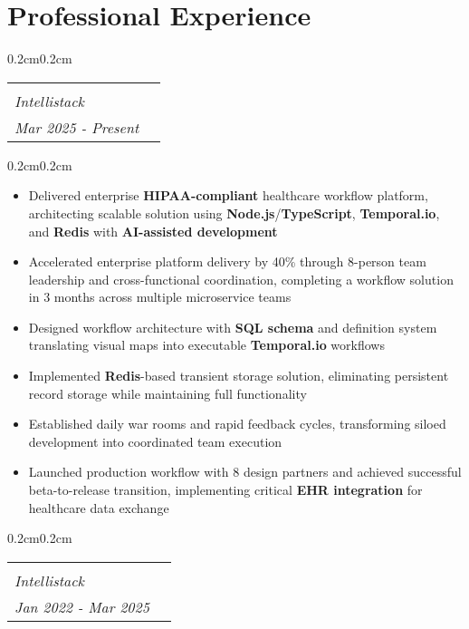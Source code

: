 \documentclass[10pt, letterpaper]{article}
\makeatletter
\newenvironment{highlights}{
    \begin{itemize}[
        topsep=0.10 cm,
        parsep=0.10 cm,
        partopsep=0pt,
        itemsep=0pt,
        leftmargin=0.4 cm + 10pt
    ]
}{
    \end{itemize}
}
\newenvironment{onecolentry}{
    \begin{adjustwidth}{0.2cm}{0.2cm}
}{
    \end{adjustwidth}
}
\newcommand{\jobentry}[4]{
    \begin{onecolentry}
        \noindent
        \begin{tabularx}{\textwidth}{@{}X>{\raggedleft\arraybackslash}p{3cm}@{\hspace{0.2cm}}}
            \begin{tabular}[t]{@{}l@{}}
                \textbf{#1}\\
                \textit{#2}
            \end{tabular} &
            \begin{tabular}[t]{@{}r@{}}
                #4\\
                \textit{#3}
            \end{tabular}
        \end{tabularx}
    \end{onecolentry}
}
\makeatother
\begin{document}
    \section{Professional Experience}
    
    \jobentry{Software Architect}{Intellistack}{Mar 2025 - Present}{Remote}

    \vspace{0.10cm}
    \begin{onecolentry}
        \begin{highlights}
            \item Delivered enterprise \textbf{HIPAA-compliant} healthcare workflow platform, architecting scalable solution using \textbf{Node.js}/\textbf{TypeScript}, \textbf{Temporal.io}, and \textbf{Redis} with \textbf{AI-assisted development}
            \item Accelerated enterprise platform delivery by 40\% through 8-person team leadership and cross-functional coordination, completing a workflow solution in 3 months across multiple microservice teams
            \item Designed workflow architecture with \textbf{SQL schema} and definition system translating visual maps into executable \textbf{Temporal.io} workflows
            \item Implemented \textbf{Redis}-based transient storage solution, eliminating persistent record storage while maintaining full functionality
            \item Established daily war rooms and rapid feedback cycles, transforming siloed development into coordinated team execution
            \item Launched production workflow with 8 design partners and achieved successful beta-to-release transition, implementing critical \textbf{EHR integration} for healthcare data exchange
        \end{highlights}
    \end{onecolentry}
    
    \vspace{0.3cm}
    \jobentry{Principal Engineer}{Intellistack}{Jan 2022 - Mar 2025}{Remote}
\end{document}

